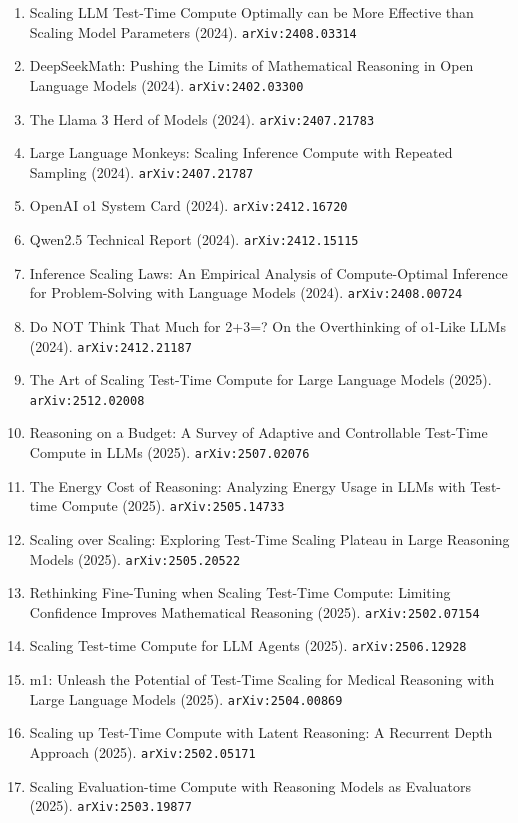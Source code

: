\documentclass[11pt]{article}
\begin{document}
\begin{enumerate}
  Model (2023). \texttt{arXiv:2305.18290}
  \item Scaling LLM Test-Time Compute Optimally can be More Effective than
  Scaling Model Parameters (2024). \texttt{arXiv:2408.03314}
  \item DeepSeekMath: Pushing the Limits of Mathematical Reasoning in Open
  Language Models (2024). \texttt{arXiv:2402.03300}
  \item The Llama 3 Herd of Models (2024). \texttt{arXiv:2407.21783}
  \item Large Language Monkeys: Scaling Inference Compute with Repeated Sampling (2024). \texttt{arXiv:2407.21787}
  \item OpenAI o1 System Card (2024). \texttt{arXiv:2412.16720}
  \item Qwen2.5 Technical Report (2024). \texttt{arXiv:2412.15115}
  \item Inference Scaling Laws: An Empirical Analysis of Compute-Optimal
  Inference for Problem-Solving with Language Models (2024). \texttt{arXiv:2408.00724}
  \item Do NOT Think That Much for 2+3=? On the Overthinking of o1-Like LLMs (2024). \texttt{arXiv:2412.21187}
  \item The Art of Scaling Test-Time Compute for Large Language Models (2025). \texttt{arXiv:2512.02008}
  \item Reasoning on a Budget: A Survey of Adaptive and Controllable Test-Time Compute in LLMs (2025). \texttt{arXiv:2507.02076}
  \item The Energy Cost of Reasoning: Analyzing Energy Usage in LLMs with Test-time Compute (2025). \texttt{arXiv:2505.14733}
  \item Scaling over Scaling: Exploring Test-Time Scaling Plateau in Large Reasoning Models (2025). \texttt{arXiv:2505.20522}
  \item Rethinking Fine-Tuning when Scaling Test-Time Compute: Limiting Confidence Improves Mathematical Reasoning (2025). \texttt{arXiv:2502.07154}
  \item Scaling Test-time Compute for LLM Agents (2025). \texttt{arXiv:2506.12928}
  \item m1: Unleash the Potential of Test-Time Scaling for Medical Reasoning with Large Language Models (2025). \texttt{arXiv:2504.00869}
  \item Scaling up Test-Time Compute with Latent Reasoning: A Recurrent Depth
  Approach (2025). \texttt{arXiv:2502.05171}
  \item Scaling Evaluation-time Compute with Reasoning Models as Evaluators (2025). \texttt{arXiv:2503.19877}

\end{enumerate}
\end{document}
